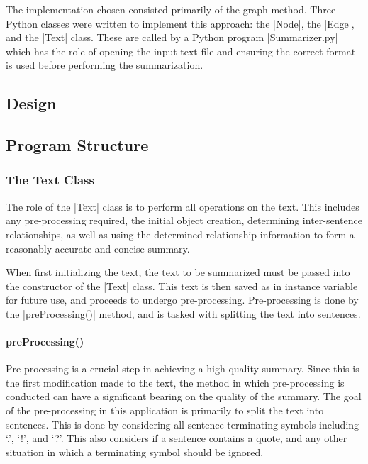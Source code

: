 
The implementation chosen consisted primarily of the graph method. Three Python classes were written to implement this approach: the |Node|, the |Edge|, and the |Text| class. These are called by a Python program |Summarizer.py| which has the role of opening the input text file and ensuring the correct format is used before performing the summarization.

\subsection{Design}



\subsection{Program Structure}
	\subsubsection{The Text Class}
	The role of the |Text| class is to perform all operations on the text. This includes any pre-processing required, the initial object creation, determining inter-sentence relationships, as well as using the determined relationship information to form a reasonably accurate and concise summary.
	
	When first initializing the text, the text to be summarized must be passed into the constructor of the |Text| class. This text is then saved as in instance variable for future use, and proceeds to undergo pre-processing. Pre-processing is done by the |preProcessing()| method, and is tasked with splitting the text into sentences.
	
	\paragraph{preProcessing()}
		Pre-processing is a crucial step in achieving a high quality summary. Since this  is the first modification made to the text, the method in which pre-processing is conducted can have a significant bearing on the quality of the summary. The goal of the pre-processing in this application is primarily to split the text into sentences. This is done by considering all sentence terminating symbols including `.', `!', and `?'. This also considers if a sentence contains a quote, and any other situation in which a terminating symbol should be ignored.
		
